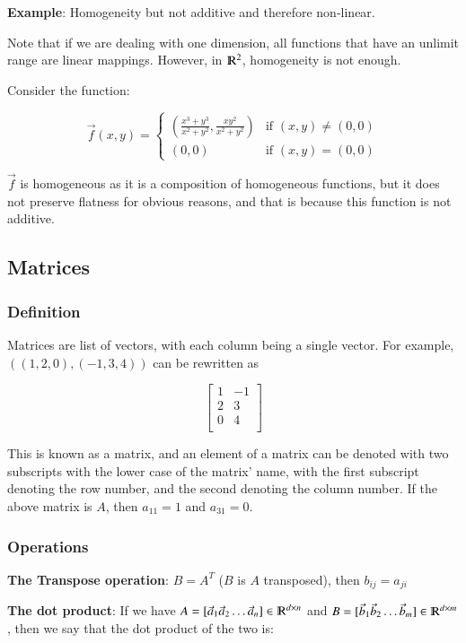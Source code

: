 \documentclass [12 pt, twoside] {book}
\newcommand\+{\text{ }}
\begin{document}
\textbf{Example}: Homogeneity but not additive and therefore non-linear.

Note that if we are dealing with one dimension, all functions that have an
unlimit range are linear mappings. However, in $\varmathbb{R}^2$, homogeneity is
not enough.

Consider the function:

\[
    \vec{f}(x, y) =
        \begin{cases}
            (\frac{x^3 + y^3}{x^2 + y^2}, \frac{xy^2}{x^2+y^2}) & \mbox{if } (x,
            y) \neq (0, 0)\\
            (0, 0) & \mbox{if } (x, y) = (0,0)
        \end{cases}
\]

$\vec{f}$ is homogeneous as it is a composition of homogeneous functions, but it
does not preserve flatness for obvious reasons, and that is because this
function is not additive.

\subsection{Matrices}
\subsubsection{Definition}
Matrices are list of vectors, with each column being a single vector. For
example, $((1,2,0),(-1, 3, 4))$ can be rewritten as

$$\left[\begin{array}{cc}
    1 & -1\\
    2 & 3\\
    0 & 4\\
\end{array} \right]$$

This is known as a matrix, and an element of a matrix can be denoted with two
subscripts with the lower case of the matrix' name, with the first subscript denoting the row number, and the second denoting the
column number. If the above matrix is $A$, then $a_{11} = 1$ and $a_{31} = 0$.

\subsubsection{Operations}

\textbf{The Transpose operation}: $B = A^T$ ($B$ is $A$ transposed),
then $b_{ij} = a_{ji}$

\textbf{The dot product}: If we have $A = [\vec{a}_1 \vec{a}_2 \dots \vec{a}_n]
\in \varmathbb{R}^{d \times n}$ and $B = [\vec{b}_1 \vec{b}_2 \dots \vec{b}_m]
\in \varmathbb{R}^{d \times m}$, then we say that the dot product of the two is:
\end{document}
